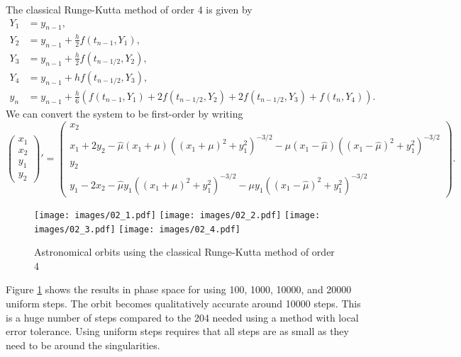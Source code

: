 \begin{solution}
  The classical Runge-Kutta method of order 4 is given by 
  \begin{align*}
    Y_1 &= y_{n-1}, \\
    Y_2 &= y_{n-1} + \frac{h}{2} f(t_{n-1}, Y_1), \\
    Y_3 &= y_{n-1} + \frac{h}{2} f(t_{n-1/2}, Y_2), \\
    Y_4 &= y_{n-1} + h f(t_{n-1/2}, Y_3), \\
    y_n &= y_{n-1} + \frac{h}{6} \left( f(t_{n-1}, Y_1) + 2 f(t_{n-1/2}, Y_2) + 2 f(t_{n-1/2}, Y_3) + f(t_n, Y_4)\right).
  \end{align*}
  We can convert the system to be first-order by writing
  \[
    \begin{pmatrix}
      x_1 \\ x_2 \\ y_1 \\ y_2
    \end{pmatrix}'
    = 
    \begin{pmatrix}
      x_2 \\
      x_1 + 2y_2 - \hat{\mu}(x_1 + \mu)((x_1 + \mu)^2 + y_1^2)^{-3/2} - \mu(x_1 - \hat{\mu})((x_1 - \hat{\mu})^2 + y_1^2)^{-3/2} \\
      y_2 \\
      y_1 - 2x_2 - \hat{\mu}y_1((x_1 + \mu)^2 + y_1^2)^{-3/2} - \mu y_1((x_1 - \hat{\mu})^2 + y_1^2)^{-3/2}
    \end{pmatrix}.
  \]
  
  \begin{figure}[h!]
    \centering
    \texttt{[image: images/02\_1.pdf]}
    \texttt{[image: images/02\_2.pdf]}
    \texttt{[image: images/02\_3.pdf]}
    \texttt{[image: images/02\_4.pdf]}
    \caption{Astronomical orbits using the classical Runge-Kutta method of order 4}
    \label{F:02}
  \end{figure}

  Figure \ref{F:02} shows the results in phase space for using 100, 1000, 10000, and 20000 uniform steps. The orbit becomes qualitatively accurate around 10000 steps. This is a huge number of steps compared to the 204 needed using a method with local error tolerance. Using uniform steps requires that all steps are as small as they need to be around the singularities.
\end{solution}